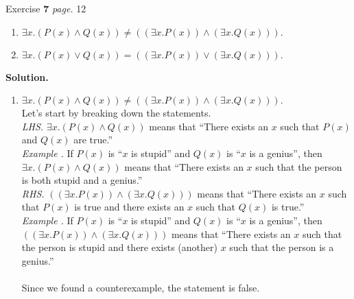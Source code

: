\documentclass[11pt]{article}
\newcommand{\problem
}[2]{
\begin{mdframed}
    Exercise \textbf{#1} \hfill \emph{page. }#2
\end{mdframed}
}
\begin{document}
\problem{7}{12}
\begin{enumerate}
	\item $\exists x.  (P(x)  \land Q(x)) \neq ((\exists x. P(x)) \land (\exists x. Q(x))).$
	\item $\exists x. (P(x) \lor Q(x)) = ((\exists x.P(x)) \lor (\exists x.Q(x))).$
\end{enumerate}

\textbf{Solution. }
\begin{enumerate}
	\item $\exists x.  (P(x)  \land Q(x)) \neq ((\exists x. P(x)) \land (\exists x. Q(x))).$\\
	      Let's start by breaking down the statements.\\
	      \emph{LHS. } $\exists x.  (P(x)  \land Q(x))$ means that ``There exists an $x$ such that $P(x)$ and $Q(x)$ are true.'' \\ \emph{Example .} If $P(x)$ is ``$x$ is stupid'' and $Q(x)$ is ``$x$ is a genius'', then $\exists x.  (P(x)  \land Q(x))$ means that ``There exists an $x$ such that the person is both stupid and a genius.''\bigskip
	      \\
	      \noindent \emph{RHS. } $((\exists x. P(x)) \land (\exists x. Q(x)))$ means that ``There exists an $x$ such that $P(x)$ is true and there exists an $x$ such that $Q(x)$ is true.''\\ \emph{Example .} If $P(x)$ is ``$x$ is stupid'' and $Q(x)$ is ``$x$ is a genius'', then $((\exists x. P(x)) \land (\exists x. Q(x)))$ means that ``There exists an $x$ such that the person is stupid and there exists (another) $x$ such that the person is a genius.''\\
	      \\
	      Since we found a counterexample, the statement is false.\\


\end{enumerate}
\end{document}
